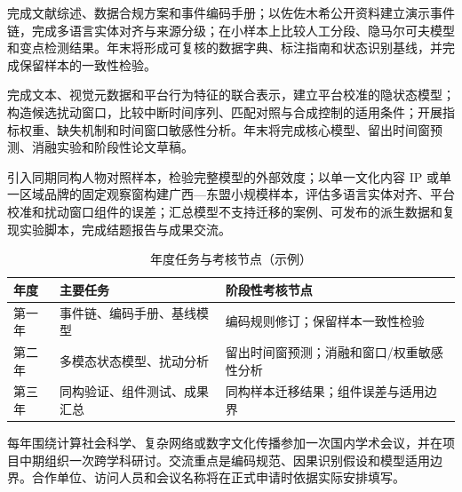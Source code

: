 \GXNSFBodyText


完成文献综述、数据合规方案和事件编码手册；以佐佐木希公开资料建立演示事件链，完成多语言实体对齐与来源分级；在小样本上比较人工分段、隐马尔可夫模型和变点检测结果。年末将形成可复核的数据字典、标注指南和状态识别基线，并完成保留样本的一致性检验。

完成文本、视觉元数据和平台行为特征的联合表示，建立平台校准的隐状态模型；构造候选扰动窗口，比较中断时间序列、匹配对照与合成控制的适用条件；开展指标权重、缺失机制和时间窗口敏感性分析。年末将完成核心模型、留出时间窗预测、消融实验和阶段性论文草稿。

引入同期同构人物对照样本，检验完整模型的外部效度；以单一文化内容 IP 或单一区域品牌的固定观察窗构建广西—东盟小规模样本，评估多语言实体对齐、平台校准和扰动窗口组件的误差；汇总模型不支持迁移的案例、可发布的派生数据和复现实验脚本，完成结题报告与成果交流。

\begin{table}[htbp]
  \centering
  \fontsize{10}{14}\selectfont
  \caption{年度任务与考核节点（示例）}
  \begin{tabularx}{\textwidth}{p{}X X}
    \toprule
    年度 & 主要任务 & 阶段性考核节点 \\
    \midrule
    第一年 & 事件链、编码手册、基线模型 & 编码规则修订；保留样本一致性检验 \\
    第二年 & 多模态状态模型、扰动分析 & 留出时间窗预测；消融和窗口/权重敏感性分析 \\
    第三年 & 同构验证、组件测试、成果汇总 & 同构样本迁移结果；组件误差与适用边界 \\
    \bottomrule
  \end{tabularx}
  \label{tab:gx-annual-plan}
\end{table}


每年围绕计算社会科学、复杂网络或数字文化传播参加一次国内学术会议，并在项目中期组织一次跨学科研讨。交流重点是编码规范、因果识别假设和模型适用边界。合作单位、访问人员和会议名称将在正式申请时依据实际安排填写。
